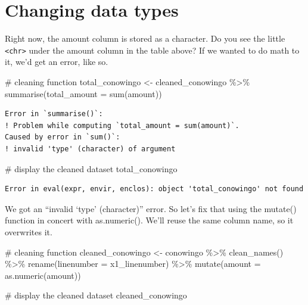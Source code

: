 \documentclass[
  letterpaper,
  DIV=11,
  numbers=noendperiod]{scrreprt}
\newenvironment{Shaded}{\begin{snugshade}}{\end{snugshade}}
\newcommand{\AttributeTok}[1]{\textcolor[rgb]{0.40,0.45,0.13}{#1}}
\newcommand{\CommentTok}[1]{\textcolor[rgb]{0.37,0.37,0.37}{#1}}
\newcommand{\FunctionTok}[1]{\textcolor[rgb]{0.28,0.35,0.67}{#1}}
\newcommand{\NormalTok}[1]{\textcolor[rgb]{0.00,0.23,0.31}{#1}}
\newcommand{\OtherTok}[1]{\textcolor[rgb]{0.00,0.23,0.31}{#1}}
\newcommand{\SpecialCharTok}[1]{\textcolor[rgb]{0.37,0.37,0.37}{#1}}
\begin{document}
\hypertarget{changing-data-types}{%
\section{Changing data types}\label{changing-data-types}}

Right now, the amount column is stored as a character. Do you see the
little \texttt{\textless{}chr\textgreater{}} under the amount column in
the table above? If we wanted to do math to it, we'd get an error, like
so.

\begin{Shaded}
\begin{Highlighting}[]
\CommentTok{\# cleaning function}
\NormalTok{total\_conowingo }\OtherTok{\textless{}{-}}\NormalTok{ cleaned\_conowingo }\SpecialCharTok{\%\textgreater{}\%}
  \FunctionTok{summarise}\NormalTok{(}\AttributeTok{total\_amount =} \FunctionTok{sum}\NormalTok{(amount))}
\end{Highlighting}
\end{Shaded}

\begin{verbatim}
Error in `summarise()`:
! Problem while computing `total_amount = sum(amount)`.
Caused by error in `sum()`:
! invalid 'type' (character) of argument
\end{verbatim}

\begin{Shaded}
\begin{Highlighting}[]
\CommentTok{\# display the cleaned dataset}
\NormalTok{total\_conowingo}
\end{Highlighting}
\end{Shaded}

\begin{verbatim}
Error in eval(expr, envir, enclos): object 'total_conowingo' not found
\end{verbatim}

We got an ``invalid `type' (character)'' error. So let's fix that using
the mutate() function in concert with as.numeric(). We'll reuse the same
column name, so it overwrites it.

\begin{Shaded}
\begin{Highlighting}[]
\CommentTok{\# cleaning function}
\NormalTok{cleaned\_conowingo }\OtherTok{\textless{}{-}}\NormalTok{ conowingo }\SpecialCharTok{\%\textgreater{}\%}
  \FunctionTok{clean\_names}\NormalTok{() }\SpecialCharTok{\%\textgreater{}\%} 
  \FunctionTok{rename}\NormalTok{(}\AttributeTok{linenumber =}\NormalTok{ x1\_linenumber) }\SpecialCharTok{\%\textgreater{}\%} 
  \FunctionTok{mutate}\NormalTok{(}\AttributeTok{amount =} \FunctionTok{as.numeric}\NormalTok{(amount))}
  

\CommentTok{\# display the cleaned dataset}
\NormalTok{cleaned\_conowingo}
\end{Highlighting}
\end{Shaded}
\end{document}
